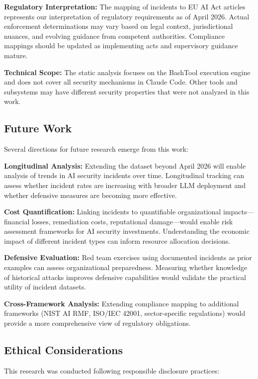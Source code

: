\documentclass[10pt,conference]{IEEEtran}
\begin{document}
\textbf{Regulatory Interpretation:} The mapping of incidents to EU AI Act articles represents our interpretation of regulatory requirements as of April 2026. Actual enforcement determinations may vary based on legal context, jurisdictional nuances, and evolving guidance from competent authorities. Compliance mappings should be updated as implementing acts and supervisory guidance mature.

\textbf{Technical Scope:} The static analysis focuses on the BashTool execution engine and does not cover all security mechanisms in Claude Code. Other tools and subsystems may have different security properties that were not analyzed in this work.

\subsection{Future Work}

Several directions for future research emerge from this work:

\textbf{Longitudinal Analysis:} Extending the dataset beyond April 2026 will enable analysis of trends in AI security incidents over time. Longitudinal tracking can assess whether incident rates are increasing with broader LLM deployment and whether defensive measures are becoming more effective.

\textbf{Cost Quantification:} Linking incidents to quantifiable organizational impacts---financial losses, remediation costs, reputational damage---would enable risk assessment frameworks for AI security investments. Understanding the economic impact of different incident types can inform resource allocation decisions.

\textbf{Defensive Evaluation:} Red team exercises using documented incidents as prior examples can assess organizational preparedness. Measuring whether knowledge of historical attacks improves defensive capabilities would validate the practical utility of incident datasets.

\textbf{Cross-Framework Analysis:} Extending compliance mapping to additional frameworks (NIST AI RMF, ISO/IEC 42001, sector-specific regulations) would provide a more comprehensive view of regulatory obligations.

\subsection{Ethical Considerations}

This research was conducted following responsible disclosure practices:
\end{document}
